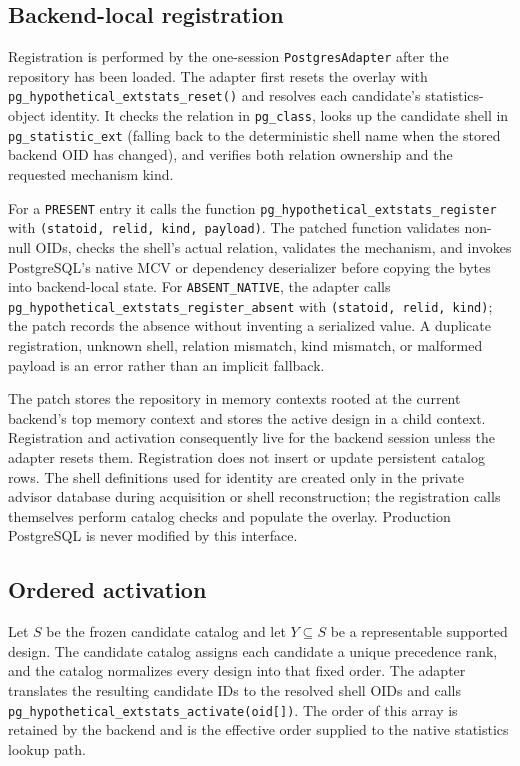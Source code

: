 \subsection{Backend-local registration}

Registration is performed by the one-session \texttt{PostgresAdapter} after
the repository has been loaded.  The adapter first resets the overlay with
\texttt{pg\_hypothetical\_extstats\_reset()} and resolves each candidate's
statistics-object identity.  It checks the relation in \texttt{pg\_class},
looks up the candidate shell in \texttt{pg\_statistic\_ext} (falling back to
the deterministic shell name when the stored backend OID has changed), and
verifies both relation ownership and the requested mechanism kind.

For a \texttt{PRESENT} entry it calls the function
\texttt{pg\_hypothetical\allowbreak\_extstats\allowbreak\_register} with
\texttt{(statoid, relid, kind, payload)}.
The patched function validates non-null OIDs, checks the shell's actual
relation, validates the mechanism, and invokes PostgreSQL's native MCV or
dependency deserializer before copying the bytes into backend-local state.
For \texttt{ABSENT\_NATIVE}, the adapter calls
\texttt{pg\_hypothetical\allowbreak\_extstats\allowbreak\_register\_absent}
with \texttt{(statoid, relid, kind)};
the patch records the absence without inventing a serialized value.  A
duplicate registration, unknown shell, relation mismatch, kind mismatch, or
malformed payload is an error rather than an implicit fallback.

The patch stores the repository in memory contexts rooted at the current
backend's top memory context and stores the active design in a child context.
Registration and activation consequently live for the backend session unless
the adapter resets them.  Registration does not insert or update persistent
catalog rows.  The shell definitions used for identity are created only in
the private advisor database during acquisition or shell reconstruction; the
registration calls themselves perform catalog checks and populate the overlay.
Production PostgreSQL is never modified by this interface.

\subsection{Ordered activation}

Let $S$ be the frozen candidate catalog and let $Y\subseteq S$ be a
representable supported design.  The candidate catalog assigns each candidate
a unique precedence rank, and the catalog normalizes every design into that
fixed order.  The adapter translates the resulting candidate IDs to the
resolved shell OIDs and calls
\texttt{pg\_hypothetical\_extstats\_activate(oid[])}.  The order of this
array is retained by the backend and is the effective order supplied to the
native statistics lookup path.

